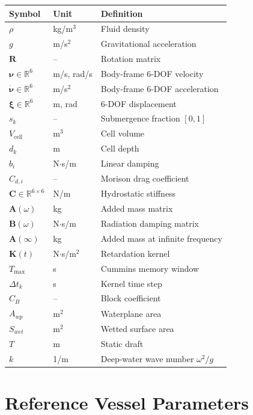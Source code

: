 \documentclass[12pt,a4paper]{article}
\newcommand{\nuvec}{\boldsymbol{\nu}}
\newcommand{\nudot}{\dot{\boldsymbol{\nu}}}
\newcommand{\xivec}{\boldsymbol{\xi}}
\newcommand{\Kvec}{\mathbf{K}}
\newcommand{\Cvec}{\mathbf{C}}
\newcommand{\Avec}{\mathbf{A}}
\newcommand{\Bvec}{\mathbf{B}}
\newcommand{\Ainf}{\mathbf{A}(\infty)}
\begin{document}
\begin{table}[H]
  \centering
  \begin{tabularx}{\linewidth}{llX}
    \toprule
    \textbf{Symbol} & \textbf{Unit} & \textbf{Definition} \\
    \midrule
    $\rho$ & kg/m$^3$ & Fluid density \\
    $g$ & m/s$^2$ & Gravitational acceleration \\
    $\mathbf{R}$ & -- & Rotation matrix \\
    $\nuvec\in\mathbb{R}^6$ & m/s, rad/s & Body-frame 6-DOF velocity \\
    $\nudot\in\mathbb{R}^6$ & m/s$^2$ & Body-frame 6-DOF acceleration \\
    $\xivec\in\mathbb{R}^6$ & m, rad & 6-DOF displacement \\
    $s_k$ & -- & Submergence fraction $[0,1]$ \\
    $V_{\text{cell}}$ & m$^3$ & Cell volume \\
    $d_k$ & m & Cell depth \\
    $b_i$ & N$\cdot$s/m & Linear damping \\
    $C_{d,i}$ & -- & Morison drag coefficient \\
    $\Cvec\in\mathbb{R}^{6\times6}$ & N/m & Hydrostatic stiffness \\
    $\Avec(\omega)$ & kg & Added mass matrix \\
    $\Bvec(\omega)$ & N$\cdot$s/m & Radiation damping matrix \\
    $\Ainf$ & kg & Added mass at infinite frequency \\
    $\Kvec(t)$ & N$\cdot$s/m$^2$ & Retardation kernel \\
    $T_{\max}$ & s & Cummins memory window \\
    $\Delta t_k$ & s & Kernel time step \\
    $C_B$ & -- & Block coefficient \\
    $A_{wp}$ & m$^2$ & Waterplane area \\
    $S_{wet}$ & m$^2$ & Wetted surface area \\
    $T$ & m & Static draft \\
    $k$ & 1/m & Deep-water wave number $\omega^2/g$ \\
    \bottomrule
  \end{tabularx}
\end{table}

\section{Reference Vessel Parameters}
\end{document}
